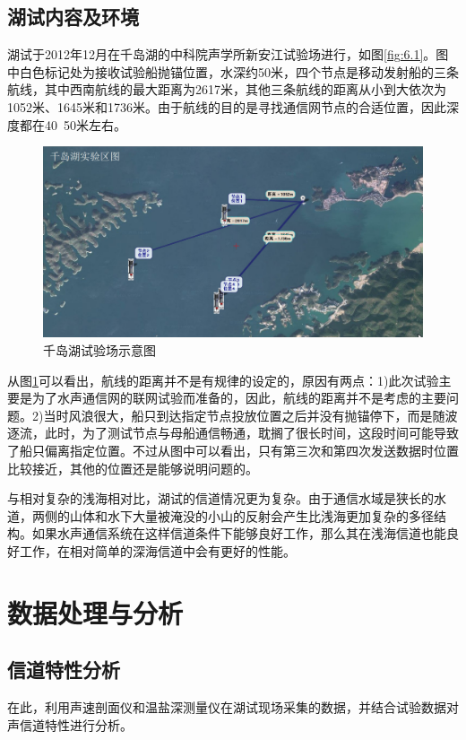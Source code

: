 \subsection{湖试内容及环境}
湖试于2012年12月在千岛湖的中科院声学所新安江试验场进行，如图\ref{fig:6.1}。图中白色标记处为接收试验船抛锚位置，水深约50米，四个节点是移动发射船的三条航线，其中西南航线的最大距离为2617米，其他三条航线的距离从小到大依次为1052米、1645米和1736米。由于航线的目的是寻找通信网节点的合适位置，因此深度都在40~50米左右。
\begin{figure}[htb]
  \begin{center}
    \includegraphics[width=\textwidth]{images/exp.pdf}
  \end{center}
  \caption{千岛湖试验场示意图}
  \label{fig:6.4}
\end{figure}
从图\ref{fig:6.4}可以看出，航线的距离并不是有规律的设定的，原因有两点：1)此次试验主要是为了水声通信网的联网试验而准备的，因此，航线的距离并不是考虑的主要问题。2)当时风浪很大，船只到达指定节点投放位置之后并没有抛锚停下，而是随波逐流，此时，为了测试节点与母船通信畅通，耽搁了很长时间，这段时间可能导致了船只偏离指定位置。不过从图中可以看出，只有第三次和第四次发送数据时位置比较接近，其他的位置还是能够说明问题的。

与相对复杂的浅海相对比，湖试的信道情况更为复杂。由于通信水域是狭长的水道，两侧的山体和水下大量被淹没的小山的反射会产生比浅海更加复杂的多径结构。如果水声通信系统在这样信道条件下能够良好工作，那么其在浅海信道也能良好工作，在相对简单的深海信道中会有更好的性能。
\section{数据处理与分析}
\subsection{信道特性分析}
在此，利用声速剖面仪和温盐深测量仪在湖试现场采集的数据，并结合试验数据对声信道特性进行分析。

